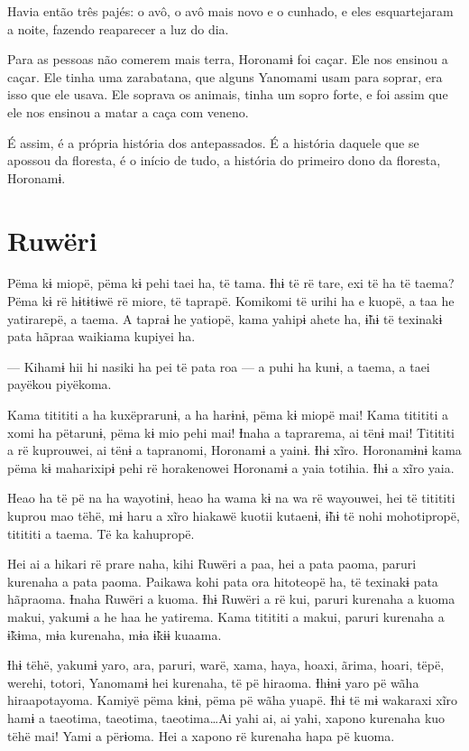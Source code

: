 Havia então três pajés: o avô, o avô mais novo e o cunhado, e eles
esquartejaram a noite, fazendo reaparecer a luz do dia. 

Para as pessoas não comerem mais terra, Horonamɨ foi caçar. Ele nos
ensinou a caçar. Ele tinha uma zarabatana, que alguns Yanomami usam para
soprar, era isso que ele usava. Ele soprava os animais, tinha um sopro
forte, e foi assim que ele nos ensinou a matar a caça com veneno. 

 É assim, é a própria história dos antepassados. É a história
daquele que se apossou da floresta, é o início de tudo, a história do
primeiro dono da floresta, Horonamɨ.

\chapter{Ruwëri}

Pëma kɨ miopë, pëma kɨ pehi taei ha, të tama. Ɨhɨ të rë tare, exi të ha
të taema? Pëma kɨ rë hɨtɨtɨwë rë miore, të taprapë. Komikomi të urihi ha
e kuopë, a taa he yatirarepë, a taema. A tapraɨ he yatiopë, kama yahipɨ
ahete ha, ɨ̃hɨ të texinakɨ pata hãpraa waikiama kupiyei ha. 

--- Kihamɨ hii hi nasiki ha pei të pata roa --- a puhi ha kunɨ, a taema, a
taei payëkou piyëkoma. 

Kama titititi a ha kuxëprarunɨ, a ha harɨnɨ, pëma kɨ miopë mai! Kama
titititi a xomi ha pëtarunɨ, pëma kɨ mio pehi mai! Ɨnaha a taprarema, ai
tënɨ mai! Titititi a rë kuprouwei, ai tënɨ a tapranomi, Horonamɨ a
yainɨ. Ɨhɨ xĩro. Horonamɨnɨ kama pëma kɨ maharixipɨ pehi rë horakenowei
Horonamɨ a yaia totihia. Ɨhɨ a xĩro yaia. 

Heao ha të pë na ha wayotinɨ, heao ha wama kɨ na wa rë wayouwei, hei të
titititi kuprou mao tëhë, mɨ haru a xĩro hiakawë kuotii kutaenɨ, ɨ̃hɨ të
nohi mohotipropë, titititi a taema. Të ka kahupropë. 

Hei ai a hikari rë prare naha, kihi Ruwëri a paa, hei a pata paoma,
paruri kurenaha a pata paoma. Paikawa kohi pata ora hitoteopë ha, të
texinakɨ pata hãpraoma. Ɨnaha Ruwëri a kuoma. Ɨhɨ Ruwëri a rë kui,
paruri kurenaha a kuoma makui, yakumɨ a he haa he yatirema. Kama
titititi a makui, paruri kurenaha a ɨ̃kɨma, mɨa kurenaha, mɨa ɨ̃kɨɨ
kuaama. 

Ɨhɨ tëhë, yakumɨ yaro, ara, paruri, warë, xama, haya, hoaxi, ãrima,
hoari, tëpë, werehi, totori, Yanomamɨ hei kurenaha, të pë hiraoma. Ɨhɨnɨ
yaro pë wãha hiraapotayoma. Kamiyë pëma kɨnɨ, pëma pë wãha yuapë. Ɨhɨ të
mɨ wakaraxi xĩro hamɨ a taeotima, taeotima, taeotima…Ai yahi ai,
ai yahi, xapono kurenaha kuo tëhë mai! Yami a përɨoma. Hei a xapono rë
kurenaha hapa pë kuoma. 

